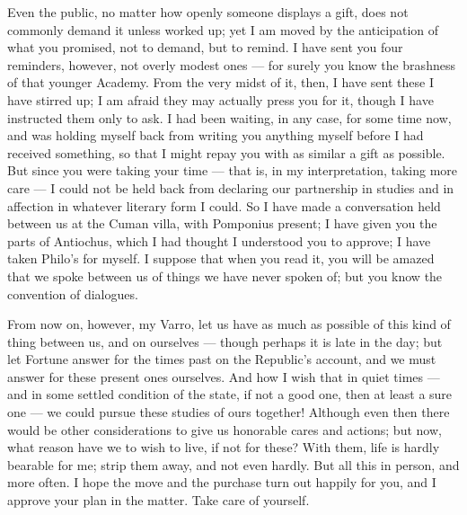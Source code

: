

 Even the public, no matter how openly someone displays a gift, does not commonly demand it unless worked up; yet I am moved by the anticipation of what you promised, not to demand, but to remind. I have sent you four reminders, however, not overly modest ones --- for surely you know the brashness of that younger Academy. From the very midst of it, then, I have sent these I have stirred up; I am afraid they may actually press you for it, though I have instructed them only to ask. I had been waiting, in any case, for some time now, and was holding myself back from writing you anything myself before I had received something, so that I might repay you with as similar a gift as possible. But since you were taking your time --- that is, in my interpretation, taking more care --- I could not be held back from declaring our partnership in studies and in affection in whatever literary form I could. So I have made a conversation held between us at the Cuman villa, with Pomponius present; I have given you the parts of Antiochus, which I had thought I understood you to approve; I have taken Philo's for myself. I suppose that when you read it, you will be amazed that we spoke between us of things we have never spoken of; but you know the convention of dialogues.

 From now on, however, my Varro, let us have as much as possible of this kind of thing between us, and on ourselves --- though perhaps it is late in the day; but let Fortune answer for the times past on the Republic's account, and we must answer for these present ones ourselves. And how I wish that in quiet times --- and in some settled condition of the state, if not a good one, then at least a sure one --- we could pursue these studies of ours together! Although even then there would be other considerations to give us honorable cares and actions; but now, what reason have we to wish to live, if not for these? With them, life is hardly bearable for me; strip them away, and not even hardly. But all this in person, and more often. I hope the move and the purchase turn out happily for you, and I approve your plan in the matter. Take care of yourself.
